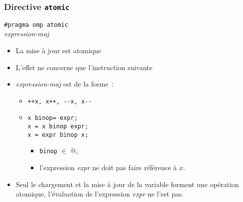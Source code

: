 \documentclass{beamer}
\begin{document}
\begin{frame}[fragile]
  \frametitle{Directive {\tt atomic}} 
  
      \begin{framed}
        {\tt \#pragma omp atomic}\\
        {\it expression-maj}
      \end{framed}

\medskip

\begin{itemize}
  \item La mise à jour est \alert{atomique}
  \item L'effet ne concerne que l'instruction suivante
  \item {\it expression-maj} est de la forme~:
    \begin{itemize}
    \item {\tt ++x, x++, {-}{-}x, x{-}{-}}
    \item {\tt x~binop= expr;}\\
      {\tt x = x binop expr;}\\
      {\tt x = expr binop x;}\\
      \begin{itemize}
        \item \texttt{binop} $\in$ \verb@ {+, *, -, /, &, &&, ^, |, ||, >>, <<}@,
        \item l'expression {\it expr} ne doit pas faire référence à $x$. 
      \end{itemize}
    \end{itemize}

  \item Seul le chargement et la mise à jour de la variable forment
    une opération atomique,
    l'évaluation de l'expression {\it expr} ne l'est pas.
  \end{itemize}


\end{frame}
\end{document}

